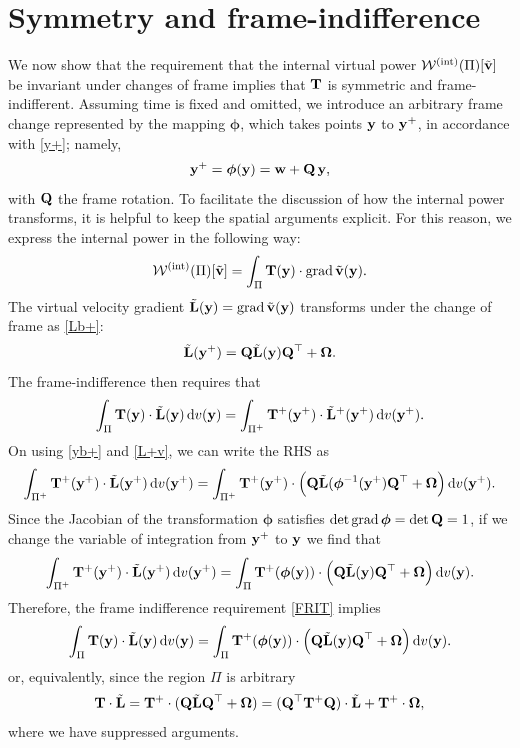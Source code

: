 \section{Symmetry and frame-indifference}\label{symPVP}
We now show that the requirement that the internal virtual power $ \mathcal{W}^{\rm (int)}(\Pi)[\tilde{\mathbf{v}}]$ be invariant under changes of frame implies that $\mathbf{T}$ is symmetric and frame-indifferent.
Assuming time is fixed and omitted, we introduce an arbitrary frame change represented by the mapping $\bm{\phi}$, which takes  points $\mathbf{y}$ to $\mathbf{y}^+$, in accordance with \eqref{y+}; namely,
\begin{equation}\label{yb+}
	\mathbf{y}^+=\bm{\phi}(\mathbf{y})=\mathbf{w}+\mathbf{Q}\,\mathbf{y},
\end{equation}
with $\mathbf{Q}$ the frame rotation.  To facilitate the discussion of how the internal power transforms, it is helpful to keep the spatial arguments explicit. For this reason, we express the internal power in the following way:
\begin{equation}
 \mathcal{W}^{\rm (int)}(\Pi)[\tilde{\mathbf{v}}]=\int_\Pi\mathbf{T}(\mathbf{y}) \cdot \operatorname{grad} \tilde{\mathbf{v}}(\mathbf{y}).
\end{equation}
The virtual velocity gradient $\tilde{\mathbf{L}}(\mathbf{y})=\operatorname{grad}\tilde{\mathbf{v}}(\mathbf{y})$ transforms under the change of frame as \eqref{Lb+}:
\begin{equation}\label{L+v}
\tilde{\mathbf{L}}(\mathbf{y}^+)=\mathbf{Q} \tilde{\mathbf{L}}(\mathbf{y})\mathbf{Q}^\top+\bm{\Omega}.
\end{equation}
The frame-indifference then requires that
\begin{equation}\label{FRIT}
\int_{\Pi}\mathbf{T}(\mathbf{y})\cdot \tilde{\mathbf{L}}(\mathbf{y})\,\mathrm{d} v(\mathbf{y})=\int_{\Pi^+}\mathbf{T}^{+}(\mathbf{y}^+)\cdot\tilde{\mathbf{L}}^+(\mathbf{y}^+)\,\mathrm{d} v(\mathbf{y}^+).
\end{equation}
On using \eqref{yb+} and \eqref{L+v}, we can write the RHS as 
\begin{equation}
\int_{\Pi^+}\mathbf{T}^{+}(\mathbf{y}^+)\cdot\tilde{\mathbf{L}}(\mathbf{y}^+)\,\mathrm{d} v(\mathbf{y}^+)=\int_{\Pi^+}\mathbf{T}^{+}(\mathbf{y}^+)\cdot\Big(  \mathbf{Q} \tilde{\mathbf{L}}(\bm{\phi}^{-1}(\mathbf{y}^+)\mathbf{Q}^\top+\bm{\Omega}\Big)  \,\mathrm{d} v(\mathbf{y}^+).
\end{equation}
Since the Jacobian of the transformation $\bm{\phi}$ satisfies $\det\operatorname{grad} \bm{\phi}=\det\mathbf{Q}=1$, if we change the variable of integration from $\mathbf{y}^+$ to $\mathbf{y}$ we find that
\begin{equation}
	\int_{\Pi^+}\mathbf{T}^{+}(\mathbf{y}^+)\cdot\tilde{\mathbf{L}}(\mathbf{y}^+)\,\mathrm{d} v(\mathbf{y}^+)=\int_{\Pi}\mathbf{T}^{+}(\bm{\phi}(\mathbf{y}))\cdot\Big(  \mathbf{Q} \tilde{\mathbf{L}}(\mathbf{y})\mathbf{Q}^\top+\bm{\Omega}\Big)  \,\mathrm{d} v(\mathbf{y}).
\end{equation}
Therefore, the frame indifference requirement \eqref{FRIT} implies
\begin{equation}
	\int_{\Pi}\mathbf{T}(\mathbf{y})\cdot \tilde{\mathbf{L}}(\mathbf{y})\,\mathrm{d} v(\mathbf{y})=\int_{\Pi}\mathbf{T}^{+}(\bm{\phi}(\mathbf{y}))\cdot\Big(  \mathbf{Q} \tilde{\mathbf{L}}(\mathbf{y})\mathbf{Q}^\top+\bm{\Omega}\Big)  \,\mathrm{d} v(\mathbf{y}).
\end{equation}
or, equivalently, since the region $\Pi$ is arbitrary
\begin{equation}
\mathbf{T}\cdot\tilde{\mathbf{L}}=\mathbf{T}^+\cdot (\mathbf{Q} \tilde{\mathbf{L}} \mathbf{Q}^\top+\bm{\Omega})=(\mathbf{Q}^\top\mathbf{T}^+\mathbf{Q})\cdot\tilde{\mathbf{L}}+\mathbf{T}^+\cdot\bm{\Omega},
\end{equation}
where we have suppressed arguments.

